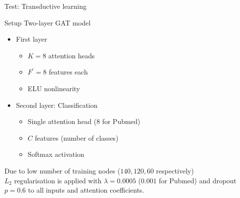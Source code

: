 \documentclass{beamer}
\theoremstyle{definition}
\begin{document}
\begin{frame}{Test: Transductive learning}
    \begin{block}{Setup}
        Two-layer GAT model
        \begin{itemize}
            \item First layer
                \begin{itemize}
                    \item \(K=8\) attention heads
                    \item \(F^\prime = 8\) features each
                    \item ELU nonlinearity
                \end{itemize}
            \item Second layer: Classification
                \begin{itemize}
                    \item Single attention head (\(8\) for Pubmed)
                    \item \(C\) features (number of classes)
                    \item Softmax activation
                \end{itemize}
        \end{itemize}
        Due to low number of training nodes (\(140, 120, 60\) respectively)\\
        \(L_2\) regularisation is applied with \(\lambda = 0.0005\) (\(0.001\) for Pubmed) and dropout \(p = 0.6\) to all inputs and attention coefficients.
    \end{block}
\end{frame}
\end{document}
